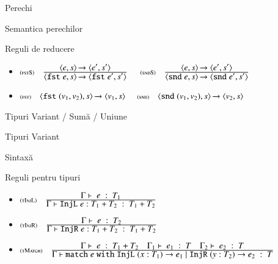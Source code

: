 \documentclass[xcolor=pdftex,romanian,colorlinks]{beamer}
\begin{document}
\begin{section}{Perechi}
\begin{frame}{Semantica perechilor}
\begin{block}{Reguli de reducere}
\begin{itemize}
\item[] $\reg[fstS]{\Ss{\c{\terminal{fst} e,s}}{\c{\terminal{fst} e',s'}}}{\Ss{\c{e,s}}{\c{e',s'}}}{}$
\hfill $\reg[sndS]{\Ss{\c{\terminal{snd} e,s}}{\c{\terminal{snd} e',s'}}}{\Ss{\c{e,s}}{\c{e',s'}}}{}$

\item[] $\reg[fst]{\Ss{\c{\terminal{fst} (v_1,v_2),s}}{\c{v_1,s}}}{}{}$ 
\hfill $\reg[snd]{\Ss{\c{\terminal{snd} (v_1,v_2),s}}{\c{v_2,s}}}{}{}$ 

\end{itemize}
\end{block}
\end{frame}

\end{section}

\begin{section}{Tipuri Variant / Sumă / Uniune}
\begin{frame}{Tipuri Variant}
\begin{block}{Sintaxă}
\end{block}

\begin{block}{Reguli pentru tipuri}
{\small\begin{itemize}
\item[] $\reg[tInjL]{\tjud{\terminal{InjL} e : T_1 + T_2}{T_1 + T_2}}{\tjud{e}{T_1}{}}{}$
\item[] $\reg[tInjR]{\tjud{\terminal{InjR} e : T_1 + T_2}{T_1 + T_2}}{\tjud{e}{T_2}{}}{}$
\item[] 
$\reg[tMatch]{\tjud{\Smatch e \Swith {\SInjL (x:T_1) \rightarrow e_1} \mid {\SInjR (y:T_2) \rightarrow e_2}}{T}}{\tjud{e}{T_1 + T_2}{}\si \tjud[\Gamma_1]{e_1}{T}{}\si \tjud[\Gamma_2]{e_2}{T}{}}{}$


\end{itemize}}
\end{block}
\end{frame}
\end{section}
\end{document}
